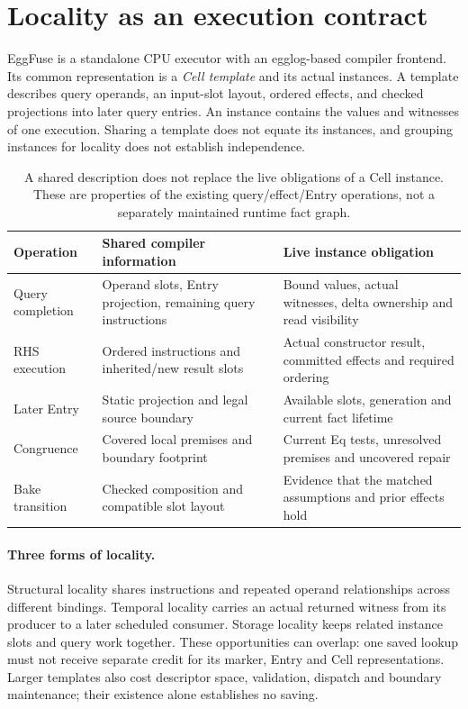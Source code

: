 \section{Locality as an execution contract}\label{sec:architecture}
EggFuse is a standalone CPU executor with an egglog-based compiler frontend.
Its common representation is a \emph{Cell template} and its actual instances.
A template describes query operands, an input-slot layout, ordered effects,
and checked projections into later query entries. An instance contains the
values and witnesses of one execution. Sharing a template does not equate its
instances, and grouping instances for locality does not establish independence.


\begin{table}[ht]
\centering\small
\begin{tabularx}{\linewidth}{lXX}
\toprule
Operation & Shared compiler information & Live instance obligation\\
\midrule
Query completion & Operand slots, Entry projection, remaining query instructions & Bound values, actual witnesses, delta ownership and read visibility\\
RHS execution & Ordered instructions and inherited/new result slots & Actual constructor result, committed effects and required ordering\\
Later Entry & Static projection and legal source boundary & Available slots, generation and current fact lifetime\\
Congruence & Covered local premises and boundary footprint & Current Eq tests, unresolved premises and uncovered repair\\
Bake transition & Checked composition and compatible slot layout & Evidence that the matched assumptions and prior effects hold\\
\bottomrule
\end{tabularx}
\caption{A shared description does not replace the live obligations of a Cell instance. These are properties of the existing query/effect/Entry operations, not a separately maintained runtime fact graph.}
\label{tab:cell-contract}
\end{table}

\paragraph{Three forms of locality.}
Structural locality shares instructions and repeated operand relationships
across different bindings. Temporal locality carries an actual returned witness
from its producer to a later scheduled consumer. Storage locality keeps related
instance slots and query work together. These opportunities can overlap: one
saved lookup must not receive separate credit for its marker, Entry and Cell
representations. Larger templates also cost descriptor space, validation,
dispatch and boundary maintenance; their existence alone establishes no saving.

